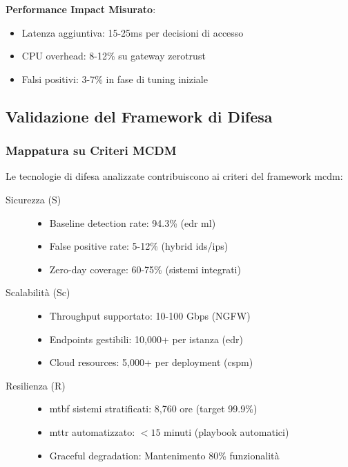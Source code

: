 \textbf{Performance Impact Misurato}:
\begin{itemize}
    \item Latenza aggiuntiva: 15-25ms per decisioni di accesso
    \item CPU overhead: 8-12\% su gateway \gls{zerotrust}
    \item Falsi positivi: 3-7\% in fase di tuning iniziale
\end{itemize}

\subsection{Validazione del Framework di Difesa}
\label{subsec:validazione-framework-difesa}

\subsubsection{Mappatura su Criteri MCDM}

Le tecnologie di difesa analizzate contribuiscono ai criteri del framework \gls{mcdm}:

\begin{description}
    \item[Sicurezza (S)] 
    \begin{itemize}
        \item Baseline detection rate: 94.3\% (\gls{edr} \gls{ml})
        \item False positive rate: 5-12\% (hybrid \gls{ids}/\gls{ips})
        \item Zero-day coverage: 60-75\% (sistemi integrati)
    \end{itemize}
    
    \item[Scalabilità (Sc)]
    \begin{itemize}
        \item Throughput supportato: 10-100 Gbps (NGFW)
        \item Endpoints gestibili: 10,000+ per istanza (\gls{edr})
        \item Cloud resources: 5,000+ per deployment (\gls{cspm})
    \end{itemize}
    
    \item[Resilienza (R)]
    \begin{itemize}
        \item \gls{mtbf} sistemi stratificati: 8,760 ore (target 99.9\%)
        \item \gls{mttr} automatizzato: $<15$ minuti (playbook automatici)
        \item Graceful degradation: Mantenimento 80\% funzionalità
    \end{itemize}
\end{description}

